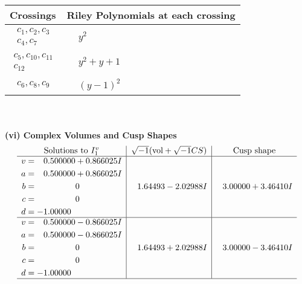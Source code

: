\documentclass[1p]{elsarticle_modified}
\theoremstyle{definition}
\newcommand{\I}{\sqrt{-1}}
\begin{document}
\begin{tabular}{m{50pt}|m{274pt}}
Crossings & \hspace{64pt}Riley Polynomials at each crossing \\
\hline $$\begin{aligned}c_{1},c_{2},c_{3}\\c_{4},c_{7}\end{aligned}$$&$\begin{aligned}
&y^2
\end{aligned}$\\
\hline $$\begin{aligned}c_{5},c_{10},c_{11}\\c_{12}\end{aligned}$$&$\begin{aligned}
&y^2+y+1
\end{aligned}$\\
\hline $$\begin{aligned}c_{6},c_{8},c_{9}\end{aligned}$$&$\begin{aligned}
&(y-1)^2
\end{aligned}$\\
\hline
\end{tabular}\\~\\
\newpage\flushleft \textbf{(vi) Complex Volumes and Cusp Shapes}
$$\begin{array}{c|c|c}  
\text{Solutions to }I^v_{1}& \I (\text{vol} + \sqrt{-1}CS) & \text{Cusp shape}\\
 \hline 
\begin{aligned}
v &= \phantom{-}0.500000 + 0.866025 I \\
a &= \phantom{-}0.500000 + 0.866025 I \\
b &= \phantom{-0.000000 } 0 \\
c &= \phantom{-0.000000 } 0 \\
d &= -1.00000\phantom{ +0.000000I}\end{aligned}
 & \phantom{-}1.64493 - 2.02988 I & \phantom{-}3.00000 + 3.46410 I \\ \hline\begin{aligned}
v &= \phantom{-}0.500000 - 0.866025 I \\
a &= \phantom{-}0.500000 - 0.866025 I \\
b &= \phantom{-0.000000 } 0 \\
c &= \phantom{-0.000000 } 0 \\
d &= -1.00000\phantom{ +0.000000I}\end{aligned}
 & \phantom{-}1.64493 + 2.02988 I & \phantom{-}3.00000 - 3.46410 I\\
 \hline 
 \end{array}$$\newpage\newpage\renewcommand{\arraystretch}{1}
\end{document}
